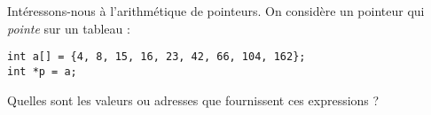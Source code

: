 \documentclass[french,a4paper,addpoints,11pt,answers]{exam}
\begin{document}
\begin{questions}
\clearpage
\question Intéressons-nous à l'arithmétique de pointeurs. On considère  un pointeur qui \emph{pointe} sur un tableau :

\begin{lstlisting}
int a[] = {4, 8, 15, 16, 23, 42, 66, 104, 162};
int *p = a;
\end{lstlisting}

Quelles sont les valeurs ou adresses que fournissent ces expressions ?

\end{questions}
\end{document}
